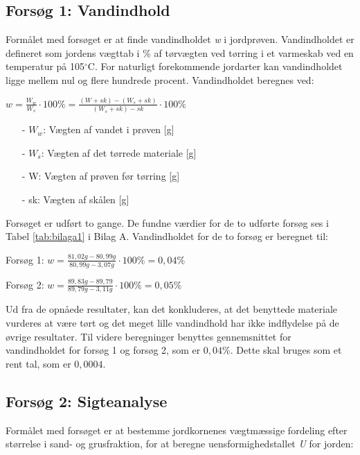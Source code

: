 \subsection{Forsøg 1: Vandindhold}
Formålet med forsøget er at finde vandindholdet \textit{w} i jordprøven. Vandindholdet er defineret som jordens vægttab i \% af tørvægten ved tørring i et varmeskab ved en temperatur på 105$^{\circ}$C. For naturligt forekommende jordarter kan vandindholdet ligge mellem nul og flere hundrede procent.
\newline
\newline
Vandindholdet beregnes ved:

\begin{center}
	$w = \frac{W_w}{W_s}\cdot 100\% = \frac{(W+sk)-(W_s+sk)}{(W_s+sk)-sk}\cdot 100\%$
\end{center}

\begin{itemize}
	\item[-] $W_w$: Vægten af vandet i prøven [g]
	\item[-] $W_s$: Vægten af det tørrede materiale [g]
	\item[-] W: Vægten af prøven før tørring [g]
	\item[-] sk: Vægten af skålen [g]
\end{itemize}

Forsøget er udført to gange. De fundne værdier for de to udførte forsøg ses i Tabel \ref{tab:bilaga1} i Bilag A. Vandindholdet for de to forsøg er beregnet til:

\begin{center}
	Forsøg 1: $w = \frac{81,\!02 g - 80,\!99 g}{80,\!99 g - 3,\!07 g}\cdot 100\% = 0,\!04\%$
\end{center}

\begin{center}
	Forsøg 2: $w = \frac{89,\!83 g - 89,\!79}{89,\!79 g - 3,\!11 g}\cdot 100\% = 0,\!05\%$
\end{center}

Ud fra de opnåede resultater, kan det konkluderes, at det benyttede materiale vurderes at være tørt og det meget lille vandindhold har ikke indflydelse på de øvrige resultater.
\newline \indent{     }  Til videre beregninger benyttes gennemsnittet for vandindholdet for forsøg 1 og forsøg 2, som er $0,\!04$\%. Dette skal bruges som et rent tal, som er $0,\!0004$. 

\subsection{Forsøg 2: Sigteanalyse}
Formålet med forsøget er at bestemme jordkornenes vægtmæssige fordeling efter størrelse i sand- og grusfraktion, for at beregne uensformighedstallet \textit{U} for jorden:

